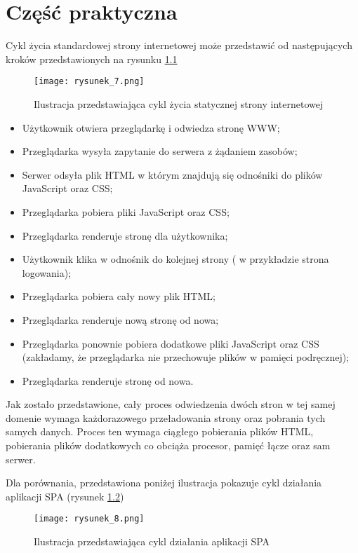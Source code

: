 \chapter{Część praktyczna}
Cykl życia standardowej strony internetowej może przedstawić od następujących kroków przedstawionych na rysunku \ref{fig:rysunek_7}

\begin{figure}[htbp]
    \centering
    \texttt{[image: rysunek\_7.png]}
    \caption{Ilustracja przedstawiająca cykl życia statycznej strony internetowej}
    \label{fig:rysunek_7}
\end{figure}

\begin{itemize}
	\item Użytkownik otwiera przeglądarkę i odwiedza stronę WWW;
    \item Przeglądarka wysyła zapytanie do serwera z żądaniem zasobów;
    \item Serwer odsyła plik HTML w którym znajdują się odnośniki do plików JavaScript oraz CSS;
    \item Przeglądarka pobiera pliki JavaScript oraz CSS;
    \item Przeglądarka renderuje stronę dla użytkownika;
    \item Użytkownik klika w odnośnik do kolejnej strony ( w przykładzie strona logowania);
    \item Przeglądarka pobiera cały nowy plik HTML;
    \item Przeglądarka renderuje nową stronę od nowa;
    \item Przeglądarka ponownie pobiera dodatkowe pliki JavaScript oraz CSS (zakładamy, że przeglądarka nie przechowuje plików w pamięci podręcznej);
    \item Przeglądarka renderuje stronę od nowa.
\end{itemize}

Jak zostało przedstawione, cały proces odwiedzenia dwóch stron w tej samej domenie wymaga każdorazowego przeładowania strony oraz pobrania tych samych danych.
Proces ten wymaga ciągłego pobierania plików HTML, pobierania plików dodatkowych co obciąża procesor, pamięć łącze oraz sam serwer.

Dla porównania, przedstawiona poniżej ilustracja pokazuje cykl działania aplikacji SPA (rysunek \ref{fig:rysunek_8})

\begin{figure}[htbp]
    \centering
    \advance\leftskip-3.5cm
    \texttt{[image: rysunek\_8.png]}
    \caption{Ilustracja przedstawiająca cykl działania aplikacji SPA}
    \label{fig:rysunek_8}
\end{figure}

